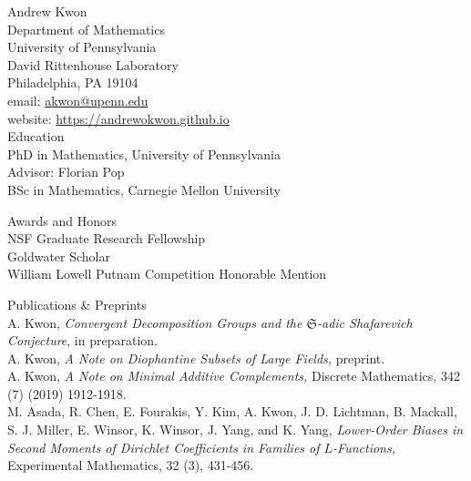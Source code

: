 \documentclass{article}
\begin{document}
\LARGE{Andrew Kwon}\vspace{0.0in}\\

\normalsize
Department of Mathematics\\
University of Pennsylvania\\
David Rittenhouse Laboratory\\
Philadelphia, PA 19104\\

email: \href{mailto:akwon@upenn.edu}{akwon@upenn.edu}\\
website: \url{https://andrewokwon.github.io}\vspace{0.25in}\\
\reversemarginpar
\Large{Education}\vspace{0.2in}\\
\normalsize
PhD in Mathematics, University of Pennsylvania\\
{\small{Advisor: Florian Pop}}\\

BSc in Mathematics, Carnegie Mellon University\marginpar[\raggedleft 2019]{}
\vspace{0.25in}

\Large{Awards and Honors}\vspace{0.2in}\\
\normalsize
\marginpar[\raggedleft 2019 - 2024]{}NSF Graduate Research Fellowship\\
\marginpar[\raggedleft 2018]{}Goldwater Scholar\\
\marginpar[\raggedleft 2017]{}William Lowell Putnam Competition Honorable Mention
\vspace{0.25in}

\Large{Publications \& Preprints}\vspace{0.2in}\\
\normalsize
A. Kwon, \textit{Convergent Decomposition Groups and the $\mathfrak{S}$-adic Shafarevich Conjecture}, in preparation.\\

A. Kwon, \textit{A Note on Diophantine Subsets of Large Fields,} preprint.\\

A. Kwon, \textit{A Note on Minimal Additive Complements,} Discrete Mathematics, 342 (7) (2019) 1912-1918.\\

M. Asada, R. Chen, E. Fourakis, Y. Kim, A. Kwon, J. D. Lichtman, B. Mackall, S. J. Miller, E. Winsor, K. Winsor, J. Yang, and K. Yang, \textit{Lower-Order Biases in Second Moments of Dirichlet Coefficients in Families of $L$-Functions,} Experimental Mathematics, 32 (3), 431-456.
\end{document}

